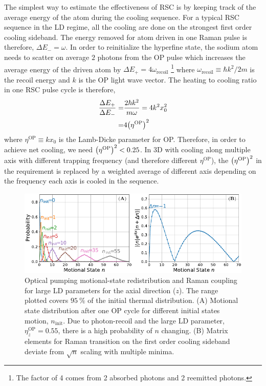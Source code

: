The simplest way to estimate the effectiveness of RSC
is by keeping track of the average energy of the atom during the cooling sequence.
For a typical RSC sequence in the LD regime, all the cooling are done on
the strongest first order cooling sideband.
The energy removed for atom driven in one Raman pulse is therefore, $\Delta E_-=\omega$.
In order to reinitialize the hyperfine state, the sodium atom needs to scatter on average
$2$ photons from the OP pulse which increases the average energy of the driven atom
by $\Delta E_+=4\omega_{\mathrm{recoil}}$
\footnote{The factor of 4 comes from 2 absorbed photons and 2 reemitted photons.}
where $\omega_{\mathrm{recoil}}\equiv \hbar k^2/2m$ is the recoil energy\cite{steck_sodium_nodate}
and $k$ is the OP light wave vector.
The heating to cooling ratio in one RSC pulse cycle is therefore,
\begin{align*}
  \frac{\Delta E_+}{\Delta E_-}=&\frac{2\hbar k^2}{m\omega}=4k^2x_0^2\\
  =&4{\left({\eta^{\mathrm{OP}}}\right)}^2
\end{align*}
where $\eta^{\mathrm{OP}}\equiv kx_0$ is the Lamb-Dicke parameter for OP.
Therefore, in order to achieve net cooling, we need ${\left({\eta^{\mathrm{OP}}}\right)}^2<0.25$.
In 3D with cooling along multiple axis with different trapping frequency
(and therefore different $\eta^{\mathrm{OP}}$), the ${\left({\eta^{\mathrm{OP}}}\right)}^2$ in the requirement
is replaced by a weighted average of different axis depending on the frequency
each axis is cooled in the sequence.

\begin{figure}
  \centering
  \includegraphics[width=\textwidth]{figures/na_rsc_challenges.pdf}
  \caption[Optical pumping motional-state redistribution and Raman coupling]{
    Optical pumping motional-state redistribution and Raman coupling for large LD parameters
    for the axial direction ($z$).
    The range plotted covers $95~\%$ of the initial thermal distribution.
    (A) Motional state distribution after one OP cycle for different initial states motion,
    $n_{\textrm{init}}$.
    Due to photon-recoil and the large LD parameter, $\eta^{\textrm{OP}}_z=0.55$,
    there is a high probability of $n$ changing.
    (B) Matrix elements for Raman transition on the first order cooling sideband
    deviate from $\sqrt{n}$ scaling with multiple minima.
    \label{fig:na-rsc-challenges}}
\end{figure}

